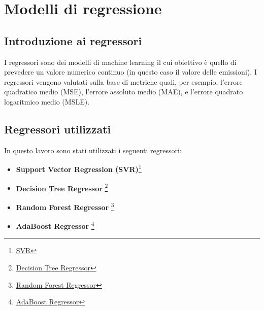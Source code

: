 \section{Modelli di regressione}
\subsection{Introduzione ai regressori}
I regressori sono dei modelli di machine learning il cui obiettivo è quello di prevedere un valore numerico continuo (in questo caso il valore delle emissioni).
I regressori vengono valutati sulla base di metriche quali, per esempio, l'errore quadratico medio (MSE), l'errore assoluto medio (MAE), e l'errore quadrato logaritmico medio (MSLE).

\subsection{Regressori utilizzati}
In questo lavoro sono stati utilizzati i seguenti regressori:
\begin{itemize}
    \item \textbf{Support Vector Regression (SVR)}\footnote{\href{https://scikit-learn.org/stable/modules/generated/sklearn.svm.SVR.html}{SVR}}{}
    \item \textbf{Decision Tree Regressor} \footnote{\href{https://scikit-learn.org/stable/modules/generated/sklearn.tree.DecisionTreeRegressor.html}{Decision Tree Regressor}}{}
    \item \textbf{Random Forest Regressor} \footnote{\href{https://scikit-learn.org/stable/modules/generated/sklearn.ensemble.RandomForestRegressor.html}{Random Forest Regressor}}{}
    \item \textbf{AdaBoost Regressor} \footnote{\href{https://scikit-learn.org/stable/modules/generated/sklearn.ensemble.AdaBoostRegressor.html}{AdaBoost Regressor}}{}
\end{itemize}
